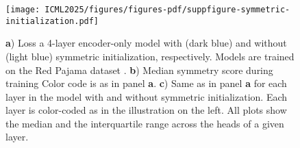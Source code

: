 \begin{figure}[ht]
\begin{center}
\texttt{[image: ICML2025/figures/figures-pdf/suppfigure-symmetric-initialization.pdf]}
\end{center}
%
\caption{
%
\textbf{a})
%
Loss a 4-layer encoder-only model with (dark blue) and without (light blue) symmetric initialization, respectively.
%
Models are trained on the Red Pajama dataset \citep{together2023redpajama}.
%
\textbf{b})
%
Median symmetry score during training
%
Color code is as in panel \textbf{a}.
%
\textbf{c})
%
Same as in panel \textbf{a} for each layer in the model with and without symmetric initialization. 
%
Each layer is color-coded as in the illustration on the left.
%
All plots show the median and the interquartile range across the heads of a given layer.
%
}
%
\label{suppfig-symmetric-initialization}
%
\end{figure}